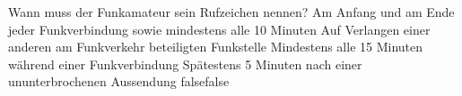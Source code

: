     {Wann muss der Funkamateur sein Rufzeichen nennen?}
    {Am Anfang und am Ende jeder Funkverbindung sowie mindestens alle 10 Minuten}
    {Auf Verlangen einer anderen am Funkverkehr beteiligten Funkstelle}
    {Mindestens alle 15 Minuten während einer Funkverbindung}
    {Spätestens 5 Minuten nach einer ununterbrochenen Aussendung}
    {false}{false}